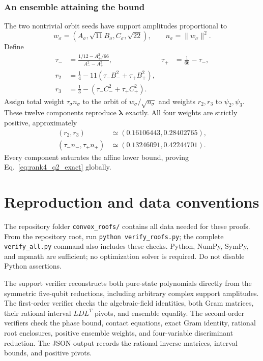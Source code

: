 \documentclass[11pt]{article}
\begin{document}
\subsubsection{An ensemble attaining the bound}
The two nontrivial orbit seeds have support amplitudes proportional to
\begin{equation}
 w_\sigma=(A_\sigma,\sqrt{11}B_\sigma,C_\sigma,\sqrt{22}),
 \qquad n_\sigma=\|w_\sigma\|^2.
\end{equation}
Define
\begin{align}
 \tau_-&=\frac{1/12-A_+^2/66}{A_-^2-A_+^2},&
 \tau_+&=\frac1{66}-\tau_-,\nonumber\\
 r_2&=\frac14-11(\tau_-B_-^2+\tau_+B_+^2),\nonumber\\
 r_3&=\frac13-(\tau_-C_-^2+\tau_+C_+^2).
\end{align}
Assign total weight $\tau_\sigma n_\sigma$ to the orbit of $w_\sigma/\sqrt{n_\sigma}$ and weights $r_2,r_3$ to $\psi_2,\psi_3$. These twelve components reproduce $\boldsymbol\lambda$ exactly. All four weights are strictly positive, approximately
\begin{align}
 (r_2,r_3)&\simeq(0.16106443,0.28402765),\nonumber\\
 (\tau_-n_-,\tau_+n_+)&\simeq(0.13246091,0.42244701).
\end{align}
Every component saturates the affine lower bound, proving Eq.~\eqref{eq:rank4_q2_exact} globally.

\section{Reproduction and data conventions}
The repository folder \texttt{convex\_roofs/} contains all data needed for these proofs. From the repository root, run \texttt{python verify\_roofs.py}; the complete \texttt{verify\_all.py} command also includes these checks. Python, NumPy, SymPy, and mpmath are sufficient; no optimization solver is required. Do not disable Python assertions.

The support verifier reconstructs both pure-state polynomials directly from the symmetric five-qubit reductions, including arbitrary complex support amplitudes. The first-order verifier checks the algebraic-field identities, both Gram matrices, their rational interval $LDL^T$ pivots, and ensemble equality. The second-order verifiers check the phase bound, contact equations, exact Gram identity, rational root enclosures, positive ensemble weights, and four-variable discriminant reduction. The JSON output records the rational inverse matrices, interval bounds, and positive pivots.
\end{document}
